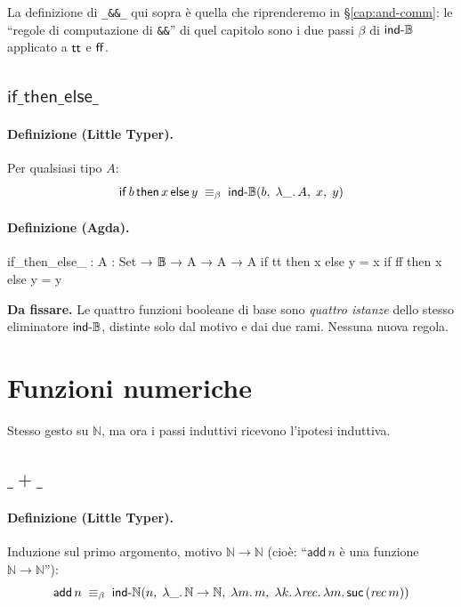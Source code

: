 \noindent La definizione di \texttt{\_\&\&\_} qui sopra \`e quella che riprenderemo in \S\ref{cap:and-comm}: le ``regole di computazione di \texttt{\&\&}'' di quel capitolo sono i due passi $\beta$ di $\mathsf{ind\text{-}\mathbb{B}}$ applicato a $\mathsf{tt}$ e $\mathsf{ff}$.

\subsection*{$\mathsf{if\_then\_else\_}$}

\paragraph{Definizione (Little Typer).} Per qualsiasi tipo $A$:
\[
\mathsf{if}\,b\,\mathsf{then}\,x\,\mathsf{else}\,y \;\equiv_{\beta}\; \mathsf{ind\text{-}\mathbb{B}}(b,\;\lambda\_.\,A,\;x,\;y)
\]

\paragraph{Definizione (Agda).}
\begin{agda}
if_then_else_ : {A : Set} → 𝔹 → A → A → A
if tt then x else y = x
if ff then x else y = y
\end{agda}

\noindent\textbf{Da fissare.} Le quattro funzioni booleane di base sono \emph{quattro istanze} dello stesso eliminatore $\mathsf{ind\text{-}\mathbb{B}}$, distinte solo dal motivo e dai due rami. Nessuna nuova regola.

\section{Funzioni numeriche}\label{sec:funz-nat}

Stesso gesto su $\mathbb{N}$, ma ora i passi induttivi ricevono l'ipotesi induttiva.

\subsection*{$\_+\_$}

\paragraph{Definizione (Little Typer).} Induzione sul primo argomento, motivo $\mathbb{N} \to \mathbb{N}$ (cio\`e: ``$\mathsf{add}\,n$ \`e una funzione $\mathbb{N} \to \mathbb{N}$''):
\[
\mathsf{add}\,n \;\equiv_{\beta}\; \mathsf{ind\text{-}\mathbb{N}}(n,\;\lambda\_.\,\mathbb{N}\to\mathbb{N},\;\lambda m.\,m,\;\lambda k.\,\lambda \mathit{rec}.\,\lambda m.\,\mathsf{suc}\,(\mathit{rec}\,m))
\]


